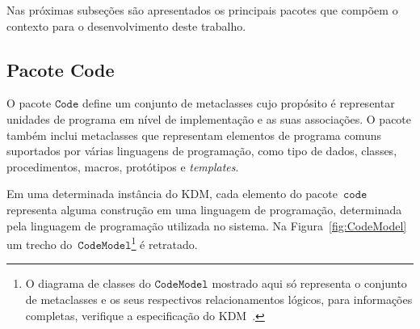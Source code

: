  Nas próximas subseções são apresentados os principais pacotes que compõem o contexto para o desenvolvimento deste trabalho.

\subsection{Pacote Code}\label{codePackage}

O pacote $\mathtt{Code}$ define um conjunto de metaclasses cujo propósito é representar unidades de programa em nível de implementação e as suas associações. O pacote também inclui metaclasses que representam elementos de programa comuns suportados por várias linguagens de programação, como tipo de dados, classes, procedimentos, macros, protótipos e \textit{templates}.



Em uma determinada instância do KDM, cada elemento do pacote~$\mathtt{code}$ representa alguma construção em uma linguagem de programação, determinada pela linguagem de programação utilizada no sistema. Na Figura~\ref{fig:CodeModel} um trecho do~$\mathtt{CodeModel}$\footnote{O diagrama de classes do $\mathtt{CodeModel}$ mostrado aqui só representa o conjunto de metaclasses e os seus respectivos relacionamentos lógicos, para informações completas, verifique a especificação do KDM~\cite{KDM:specification}.} é retratado.



